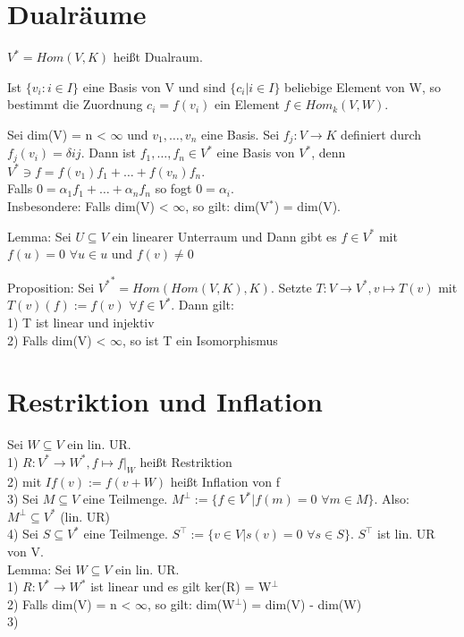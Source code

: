 \section{Dualräume}
$V^* = Hom(V, K)$ heißt Dualraum.
\begin{compactitem}
\item Ist $\{ v_i : i \in I \}$ eine Basis von V und sind $\{ c_i | i \in I \}$ beliebige Element von W, so bestimmt die Zuordnung $c_i = f(v_i)$ ein Element $f \in Hom_k(V,W)$.
\item Sei dim(V) = n < $\infty$ und $v_1, …, v_n$ eine Basis. Sei $f_j: V \to K$ definiert durch $f_j(v_i) = \delta{ij}$. Dann ist $f_1, …, f_n \in V^*$ eine Basis von $V^*$, denn $V^* \ni f = f(v_1)f_1 + … + f(v_n)f_n$.\\
Falls $0 = \alpha_1 f_1 + … + \alpha_n f_n$ so fogt $0 = \alpha_i$.\\
Insbesondere: Falls dim(V) < $\infty$, so gilt: dim(V$^*$) = dim(V).\\
\item Lemma: Sei $U \subseteq V$ ein linearer Unterraum und %
Dann gibt es $f \in V^*$ mit $f(u) = 0$ $\forall u \in u$ und $f(v) \neq 0$
\item Proposition: Sei ${V^*}^* = Hom(Hom(V,K), K)$. Setzte $T: V \to V^*, v \mapsto T(v)$ mit $T(v)(f) := f(v)$ $\forall f \in V^*$. Dann gilt:\\
1) T ist linear und injektiv\\
2) Falls dim(V) < $\infty$, so ist T ein Isomorphismus
\end{compactitem}

\section{Restriktion und Inflation}
Sei $W \subseteq V$ ein lin. UR.\\
1) $R: V^* \to W^*, f \mapsto f|_W$ heißt Restriktion\\
2) %
mit $If(v) := f(v + W)$ heißt Inflation von f\\
3) Sei $M \subseteq V$ eine Teilmenge. $M^\perp := \{ f \in V^* | f(m) = 0$ $\forall m \in M \}$. Also: $M^\perp \subseteq V^*$ (lin. UR)\\
4) Sei $S \subseteq V^*$ eine Teilmenge. $S^\top := \{ v \in V | s(v) = 0$ $\forall s \in S \}$. $S^\top$ ist lin. UR von V.\\
Lemma: Sei $W \subseteq V$ ein lin. UR.\\
1) $R: V^* \to W^*$ ist linear und es gilt ker(R) = W$^\perp$\\
2) Falls dim(V) = n < $\infty$, so gilt: dim(W$^\perp$) = dim(V) - dim(W)\\
3) %

